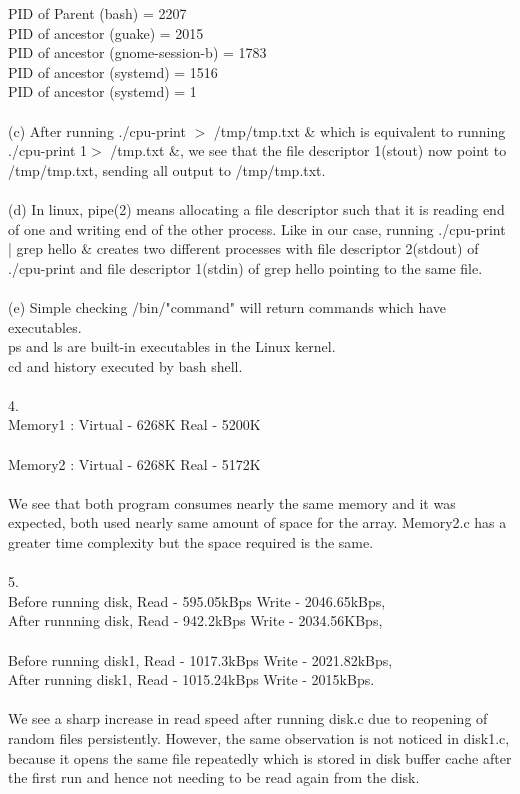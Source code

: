 \documentclass[12pt, letterpaper]{article}
\begin{document}
	       PID of Parent (bash) = 2207\\
	       PID of ancestor (guake) = 2015 \\
	       PID of ancestor (gnome-session-b) = 1783 \\
	       PID of ancestor (systemd) = 1516\\
	       PID of ancestor (systemd) = 1 \\ \\ 
	   (c) After running ./cpu-print $>$ /tmp/tmp.txt \&  which is equivalent to running ./cpu-print 1$>$ /tmp.txt \&, we see that the file descriptor 1(stout) now point to /tmp/tmp.txt, sending all output to /tmp/tmp.txt.  \\ \\ 
	   (d) In linux, pipe(2) means allocating a file descriptor such that it is reading end of one and writing end of the other process. Like in our case, running ./cpu-print | grep hello \& creates two different processes with file descriptor 2(stdout) of ./cpu-print and file descriptor 1(stdin) of grep hello pointing to the same file. \\ \\ 
	   (e) Simple checking /bin/"command" will return commands which have executables. \\ 
		ps and ls are built-in executables in the Linux kernel. \\ 
		cd and history executed by bash shell. \\ \\ 
	 4.  \\ Memory1 : Virtual - 6268K  Real - 5200K \\ \\  
	 	Memory2 : Virtual - 6268K  Real - 5172K \\ \\ 
	 	We see that both program consumes nearly the same memory and it was expected, both used nearly same amount of space for the array. Memory2.c has a greater time complexity but the space required is the same. \\ \\ 
	 5. \\ Before running disk, Read - 595.05kBps Write - 2046.65kBps, \\ 
	 	After runnning disk, Read - 942.2kBps Write - 2034.56KBps, \\ \\ 
	 	Before running disk1, Read - 1017.3kBps Write - 2021.82kBps, \\ 
	 	After running disk1, Read - 1015.24kBps Write - 2015kBps. \\ \\ 
	 	We see a sharp increase in read speed after running disk.c due to reopening of random files persistently. However, the same observation is not noticed in disk1.c, because it opens the same file repeatedly which is stored in disk buffer cache after the first run and hence not needing to be read again from the disk. \\ \\   
	 	 	        
		
\end{document}
